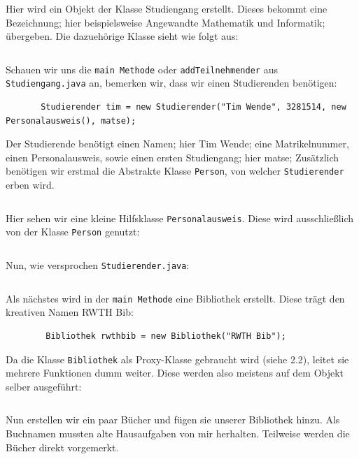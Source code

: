 \documentclass{article}
\newcommand{\gqq}[1]{\glqq{}#1\grqq{}}
\begin{document}
    Hier wird ein Objekt der Klasse Studiengang erstellt.
    Dieses bekommt eine Bezeichnung; hier beispielsweise \gqq{Angewandte Mathematik und Informatik}; übergeben.
    Die dazuehörige Klasse sieht wie folgt aus:

    \inputminted{java}{Studiengang.java}

    \newpage
    Schauen wir uns die \texttt{main Methode} oder \texttt{addTeilnehmender} aus \texttt{Studiengang.java} an, bemerken wir, dass wir einen Studierenden benötigen:

    \begin{verbatim}
       Studierender tim = new Studierender("Tim Wende", 3281514, new Personalausweis(), matse);
    \end{verbatim}

    Der Studierende benötigt einen Namen; hier \gqq{Tim Wende}; eine Matrikelnummer, einen Personalausweis, sowie einen ersten Studiengang; hier \gqq{matse};
    Zusätzlich benötigen wir erstmal die Abstrakte Klasse \texttt{Person}, von welcher \texttt{Studierender} erben wird.

    \inputminted{java}{Person.java}

    \newpage
    Hier sehen wir eine kleine Hilfsklasse \texttt{Personalausweis}.
    Diese wird ausschließlich von der Klasse \texttt{Person} genutzt:

    \inputminted{java}{Personalausweis.java}

    \newpage
    Nun, wie versprochen \texttt{Studierender.java}:

    \inputminted{java}{Studierender.java}

    \newpage
    Als nächstes wird in der \texttt{main Methode} eine Bibliothek erstellt.
    Diese trägt den kreativen Namen \gqq{RWTH Bib}:
    
    \begin{verbatim}
        Bibliothek rwthbib = new Bibliothek("RWTH Bib");
    \end{verbatim}

    Da die Klasse \texttt{Bibliothek} als \gqq{Proxy}-Klasse gebraucht wird (siehe 2.2), leitet sie mehrere Funktionen \gqq{dumm} weiter. Diese werden also meistens auf dem Objekt selber ausgeführt:

    \inputminted{java}{Bibliothek.java}

    \newpage
    Nun erstellen wir ein paar Bücher und fügen sie unserer Bibliothek hinzu.
    Als Buchnamen mussten alte Hausaufgaben von mir herhalten.
    Teilweise werden die Bücher direkt vorgemerkt.
\end{document}
